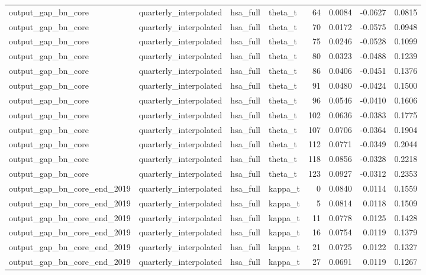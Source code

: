 \begin{tabular}{llllrrrr}
output\_gap\_bn\_core & quarterly\_interpolated & hsa\_full & theta\_t & 64 & 0.0084 & -0.0627 & 0.0815 \\
output\_gap\_bn\_core & quarterly\_interpolated & hsa\_full & theta\_t & 70 & 0.0172 & -0.0575 & 0.0948 \\
output\_gap\_bn\_core & quarterly\_interpolated & hsa\_full & theta\_t & 75 & 0.0246 & -0.0528 & 0.1099 \\
output\_gap\_bn\_core & quarterly\_interpolated & hsa\_full & theta\_t & 80 & 0.0323 & -0.0488 & 0.1239 \\
output\_gap\_bn\_core & quarterly\_interpolated & hsa\_full & theta\_t & 86 & 0.0406 & -0.0451 & 0.1376 \\
output\_gap\_bn\_core & quarterly\_interpolated & hsa\_full & theta\_t & 91 & 0.0480 & -0.0424 & 0.1500 \\
output\_gap\_bn\_core & quarterly\_interpolated & hsa\_full & theta\_t & 96 & 0.0546 & -0.0410 & 0.1606 \\
output\_gap\_bn\_core & quarterly\_interpolated & hsa\_full & theta\_t & 102 & 0.0636 & -0.0383 & 0.1775 \\
output\_gap\_bn\_core & quarterly\_interpolated & hsa\_full & theta\_t & 107 & 0.0706 & -0.0364 & 0.1904 \\
output\_gap\_bn\_core & quarterly\_interpolated & hsa\_full & theta\_t & 112 & 0.0771 & -0.0349 & 0.2044 \\
output\_gap\_bn\_core & quarterly\_interpolated & hsa\_full & theta\_t & 118 & 0.0856 & -0.0328 & 0.2218 \\
output\_gap\_bn\_core & quarterly\_interpolated & hsa\_full & theta\_t & 123 & 0.0927 & -0.0312 & 0.2353 \\
output\_gap\_bn\_core\_end\_2019 & quarterly\_interpolated & hsa\_full & kappa\_t & 0 & 0.0840 & 0.0114 & 0.1559 \\
output\_gap\_bn\_core\_end\_2019 & quarterly\_interpolated & hsa\_full & kappa\_t & 5 & 0.0814 & 0.0118 & 0.1509 \\
output\_gap\_bn\_core\_end\_2019 & quarterly\_interpolated & hsa\_full & kappa\_t & 11 & 0.0778 & 0.0125 & 0.1428 \\
output\_gap\_bn\_core\_end\_2019 & quarterly\_interpolated & hsa\_full & kappa\_t & 16 & 0.0754 & 0.0119 & 0.1379 \\
output\_gap\_bn\_core\_end\_2019 & quarterly\_interpolated & hsa\_full & kappa\_t & 21 & 0.0725 & 0.0122 & 0.1327 \\
output\_gap\_bn\_core\_end\_2019 & quarterly\_interpolated & hsa\_full & kappa\_t & 27 & 0.0691 & 0.0119 & 0.1267 \\

\end{tabular}
